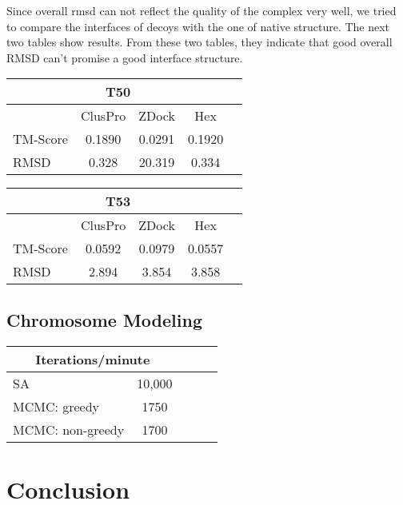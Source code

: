 \documentclass{article}
\begin{document}
Since overall rmsd can not reflect the quality of the complex very well, we tried to compare the interfaces of decoys with the one of native structure. The next two tables show results. From these two tables, they indicate that good overall RMSD can’t promise a good interface structure.

\begin{center}
\begin{tabular}{|l|c|c|c|r|}
\multicolumn{4}{c}{T50} \\
    \hline
      & ClusPro & ZDock & Hex \\ \hline
    TM-Score & 0.1890 & 0.0291 & 0.1920 \\ \hline
    RMSD & 0.328 & 20.319 & 0.334 \\
    \hline
    \end{tabular}
\end{center}


\begin{center}
\begin{tabular}{|l|c|c|c|r|}
\multicolumn{4}{c}{T53} \\
    \hline
      & ClusPro & ZDock & Hex \\ \hline
    TM-Score & 0.0592 & 0.0979 & 0.0557 \\ \hline
    RMSD & 2.894 & 3.854 & 3.858 \\
    \hline
    \end{tabular}
\end{center}


\subsection{Chromosome Modeling}

\begin{center}
\begin{tabular}{|l|c|c|c|r|}
\multicolumn{2}{c}{Iterations/minute} \\
    \hline
    SA & 10,000 \\ \hline
    MCMC: greedy & 1750    \\ \hline
    MCMC: non-greedy & 1700    \\ \hline
    \end{tabular}
\end{center}


\section{Conclusion}
\end{document}
